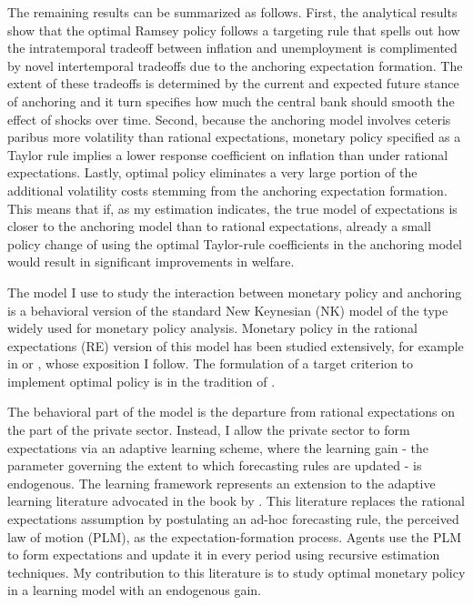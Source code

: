 \documentclass[11pt]{article}
\renewcommand{\[}{\begin{equation}}
\renewcommand{\]}{\end{equation}}
\begin{document}
The remaining results can be summarized as follows.  First, the analytical results show that the optimal Ramsey policy follows a targeting rule that spells out how the intratemporal tradeoff between inflation and unemployment is complimented by novel intertemporal tradeoffs due to the anchoring expectation formation. The extent of these tradeoffs is determined by the current and expected future stance of anchoring and it turn specifies how much the central bank should smooth the effect of shocks over time. Second, because the anchoring model involves ceteris paribus more volatility than rational expectations, monetary policy specified as a Taylor rule implies a lower response coefficient on inflation than under rational expectations. Lastly, optimal policy eliminates a very large portion of the additional volatility costs stemming from the anchoring expectation formation. This means that if, as my estimation indicates, the true model of expectations is closer to the anchoring model than to rational expectations, already a small policy change of using the optimal Taylor-rule coefficients in the anchoring model would result in significant improvements in welfare.


The model I use to study the interaction between monetary policy and anchoring is a behavioral version of the standard New Keynesian (NK) model of the type widely used for monetary policy analysis. Monetary policy in the rational expectations (RE) version of this model has been studied extensively, for example in \cite{clarida1999science} or \cite{woodford2011interest}, whose exposition I follow. The formulation of a target criterion to implement optimal policy is in the tradition of \cite{svensson1999inflation}.

The behavioral part of the model is the departure from rational expectations on the part of the private sector. Instead, I allow the private sector to form expectations via an adaptive learning scheme, where the learning gain - the parameter governing the extent to which forecasting rules are updated - is endogenous. The learning framework represents an extension to the adaptive learning literature advocated in the book by \cite{evans_honkapohja2001}. This literature replaces the rational expectations assumption by postulating an ad-hoc forecasting rule, the perceived law of motion (PLM), as the expectation-formation process. Agents use the PLM to form expectations and update it in every period using recursive estimation techniques. My contribution to this literature is to study optimal monetary policy in a learning model with an endogenous gain.
\end{document}
